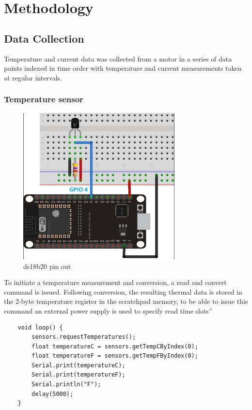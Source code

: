 
\section{Methodology}

\subsection{Data Collection}

Temperature and current data was collected from a motor in a series of data points indexed in time order with temperature and current measurements taken at regular intervals. 

\subsubsection{Temperature sensor}

\begin{figure}[!h]
	\centering
	\includegraphics[width=0.7\linewidth, height = 8cm]{Figures/ds18b20}
	\caption{ds18b20 pin out}
	
\end{figure}
To initiate a temperature measurement
and conversion, a read and convert command is issued. Following conversion, the resulting
thermal data is stored in the 2-byte temperature register in the scratchpad memory, to be able to issue this command an external power supply is used to specify read time slots” 

\pagebreak 

\begin{lstlisting}
	void loop() {
		sensors.requestTemperatures(); 
		float temperatureC = sensors.getTempCByIndex(0);
		float temperatureF = sensors.getTempFByIndex(0);
		Serial.print(temperatureC);
		Serial.print(temperatureF);
		Serial.println("F");
		delay(5000);
	}
\end{lstlisting}


